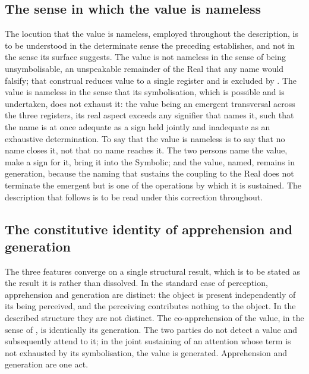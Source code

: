 \subsection{The sense in which the value is nameless}
\label{p10:sec:nameless-corrected}

The locution that the value is nameless, employed throughout the description, is to be understood in the determinate sense the preceding establishes, and not in the sense its surface suggests. The value is not nameless in the sense of being unsymbolisable, an unspeakable remainder of the Real that any name would falsify; that construal reduces value to a single register and is excluded by . The value is nameless in the sense that its symbolisation, which is possible and is undertaken, does not exhaust it: the value being an emergent transversal across the three registers, its real aspect exceeds any signifier that names it, such that the name is at once adequate as a sign held jointly and inadequate as an exhaustive determination. To say that the value is nameless is to say that no name closes it, not that no name reaches it. The two persons name the value, make a sign for it, bring it into the Symbolic; and the value, named, remains in generation, because the naming that sustains the coupling to the Real does not terminate the emergent but is one of the operations by which it is sustained. The description that follows is to be read under this correction throughout.

\subsection{The constitutive identity of apprehension and generation}
\label{p10:sec:paradox}

The three features converge on a single structural result, which is to be stated as the result it is rather than dissolved. In the standard case of perception, apprehension and generation are distinct: the object is present independently of its being perceived, and the perceiving contributes nothing to the object. In the described structure they are not distinct. The co-apprehension of the value, in the sense of , is identically its generation. The two parties do not detect a value and subsequently attend to it; in the joint sustaining of an attention whose term is not exhausted by its symbolisation, the value is generated. Apprehension and generation are one act.

